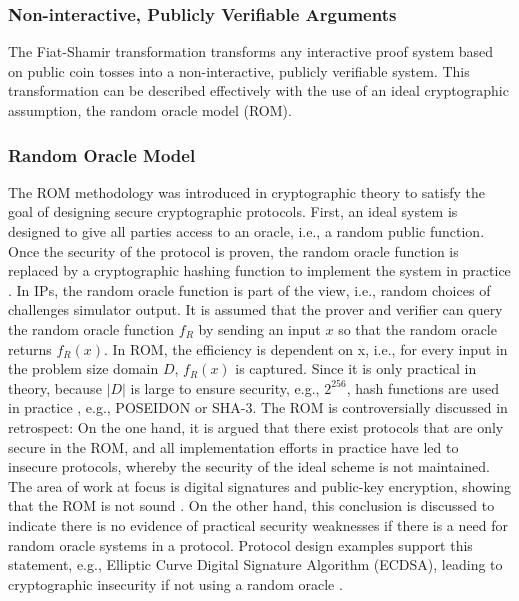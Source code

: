 \subsubsection{Non-interactive, Publicly Verifiable Arguments}
The Fiat-Shamir transformation transforms any interactive proof system based on public coin tosses into a non-interactive, publicly verifiable system. This transformation can be described effectively with the use of an ideal cryptographic assumption, the random oracle model (ROM). 
\subsubsection{Random Oracle Model}
The ROM methodology was introduced in cryptographic theory to satisfy the goal of designing secure cryptographic protocols. First, an ideal system is designed to give all parties access to an oracle, i.e., a random public function. Once the security of the protocol is proven, the random oracle function is replaced by a cryptographic hashing function to implement the system in practice \citep{ROMBellare}. In IPs, the random oracle function is part of the view, i.e., random choices of challenges simulator output. It is assumed that the prover and verifier can query the random oracle function \(f_R\) by sending an input \(x\) so that the random oracle returns \(f_R(x)\). In ROM, the efficiency is dependent on x, i.e., for every input in the problem size domain \(D\), \(f_R(x)\) is captured. Since it is only practical in theory, because \(|D|\) is large to ensure security, e.g., \(2^{256}\), hash functions are used in practice \citep{ROMBellare, Thaler}, e.g., POSEIDON or SHA-3. The ROM is controversially discussed in retrospect: On the one hand, it is argued that there exist protocols that are only secure in the ROM, and all implementation efforts in practice have led to insecure protocols, whereby the security of the ideal scheme is not maintained. The area of work at focus is digital signatures and public-key encryption, showing that the ROM is not sound \citep{ROMCanetti}. On the other hand, this conclusion is discussed to indicate there is no evidence of practical security weaknesses if there is a need for random oracle systems in a protocol. Protocol design examples support this statement, e.g., Elliptic Curve Digital Signature Algorithm (ECDSA), leading to cryptographic insecurity if not using a random oracle \citep{ROMretroKoblitz}. 
